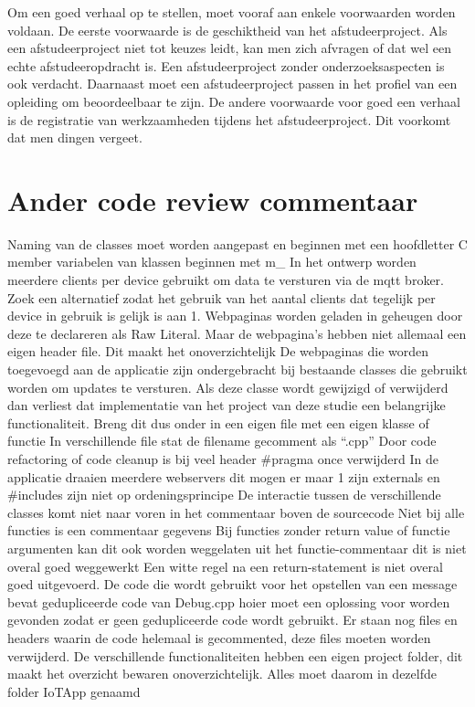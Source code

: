 			Om een goed verhaal op te stellen, moet vooraf aan enkele voorwaarden
			worden voldaan. De eerste voorwaarde is de geschiktheid van het
			afstudeerproject. Als een afstudeerproject niet tot keuzes leidt, kan
			men zich afvragen of dat wel een echte afstudeeropdracht is. Een
			afstudeerproject zonder onderzoeksaspecten is ook verdacht. Daarnaast
			moet een afstudeerproject passen in het profiel van een opleiding om
			beoordeelbaar te zijn. De andere voorwaarde voor goed een verhaal is
			de registratie van werkzaamheden tijdens het afstudeerproject. Dit
			voorkomt dat men dingen vergeet.
			\section{Ander code review commentaar}
			
			Naming van de classes moet worden aangepast en beginnen met een hoofdletter C 
			member variabelen van klassen beginnen met m\_ 
			In het ontwerp worden meerdere clients per device gebruikt om data te versturen via de mqtt broker. Zoek een alternatief zodat het gebruik van het aantal clients dat tegelijk per device in gebruik is gelijk is aan 1. 
			Webpaginas worden geladen in geheugen door deze te declareren als Raw Literal. Maar de webpagina's hebben niet allemaal een eigen header file. Dit maakt het onoverzichtelijk 
			De webpaginas die worden toegevoegd aan de applicatie zijn ondergebracht  bij bestaande classes die gebruikt worden om updates te versturen. Als deze classe wordt gewijzigd of verwijderd dan verliest dat implementatie van het project van deze studie een belangrijke functionaliteit. Breng dit dus onder in een eigen file met een eigen klasse of functie 
			In verschillende file stat de filename gecomment als “.cpp” 
			Door code refactoring of code cleanup is bij veel header #pragma once verwijderd 
			In de applicatie draaien meerdere webservers dit mogen er maar 1 zijn 
			externals en #includes zijn niet op ordeningsprincipe De interactie tussen de verschillende classes komt niet naar voren in het commentaar boven de sourcecode 
			Niet bij alle functies is een commentaar gegevens 
			Bij functies zonder return value of functie argumenten kan dit ook worden weggelaten uit het functie-commentaar dit is niet overal goed weggewerkt 
			Een witte regel na een return-statement is niet overal goed uitgevoerd. 
			De code die wordt gebruikt voor het opstellen van een message bevat gedupliceerde code van Debug.cpp hoier moet een oplossing voor worden gevonden zodat er geen gedupliceerde code wordt gebruikt. 
			Er staan nog files en headers waarin de code helemaal is gecommented, deze files moeten worden verwijderd. 
			De verschillende functionaliteiten hebben een eigen project folder, dit maakt het overzicht bewaren onoverzichtelijk. Alles moet daarom in dezelfde folder IoTApp genaamd 
			
